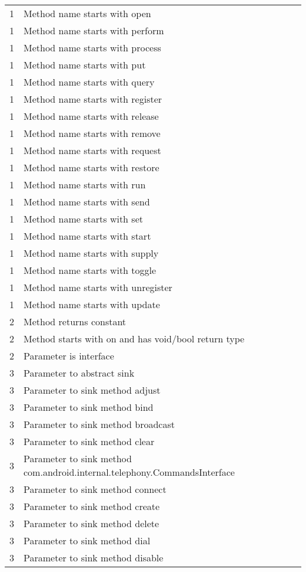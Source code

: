 \begin{center}
\begin{longtable}{l|l}
    1 & Method name starts with open \\
    1 & Method name starts with perform \\
    1 & Method name starts with process \\
    1 & Method name starts with put \\
    1 & Method name starts with query \\
    1 & Method name starts with register \\
    1 & Method name starts with release \\
    1 & Method name starts with remove \\
    1 & Method name starts with request \\
    1 & Method name starts with restore \\
    1 & Method name starts with run \\
    1 & Method name starts with send \\
    1 & Method name starts with set \\
    1 & Method name starts with start \\
    1 & Method name starts with supply \\
    1 & Method name starts with toggle \\
    1 & Method name starts with unregister \\
    1 & Method name starts with update \\
    2 & Method returns constant \\
    2 & Method starts with on and has void/bool return type \\
    2 & Parameter is interface \\
    3 & Parameter to abstract sink \\
    3 & Parameter to sink method adjust \\
    3 & Parameter to sink method bind \\
    3 & Parameter to sink method broadcast \\
    3 & Parameter to sink method clear \\
    3 & Parameter to sink method com.android.internal.telephony.CommandsInterface \\
    3 & Parameter to sink method connect \\
    3 & Parameter to sink method create \\
    3 & Parameter to sink method delete \\
    3 & Parameter to sink method dial \\
    3 & Parameter to sink method disable \\

\end{longtable}
\end{center}
